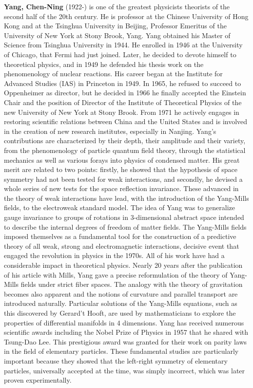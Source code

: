 \textbf{Yang, Chen-Ning} (1922-) is one of the greatest physicists theorists of the second half of the 20th century. He is professor at the Chinese University of Hong Kong and at the Tsinghua University in Beijing, Professor Emeritus of the University of New York at Stony Brook, Yang. Yang obtained his Master of Science from Tsinghua University in 1944. He enrolled in 1946 at the University of Chicago, that Fermi had just joined. Later, he decided to devote himself to theoretical physics, and in 1949 he defended his thesis work on the phenomenology of nuclear reactions. His career began at the Institute for Advanced Studies (IAS) in Princeton in 1949. In 1965, he refused to succeed to Oppenheimer as director, but he decided in 1966 he finally accepted the Einstein Chair and the position of Director of the Institute of Theoretical Physics of the new University of New York at Stony Brook. From 1971 he actively engages in restoring scientific relations between China and the United States and is involved in the creation of new research institutes, especially in Nanjing. Yang's contributions are characterized by their depth, their amplitude and their variety, from the phenomenology of particle quantum field theory, through the statistical mechanics as well as various forays into physics of condensed matter. His great merit are related to two points: firstly, he showed that the hypothesis of space symmetry had not been tested for weak interactions, and secondly, he devised a whole series of new tests for the space reflection invariance. These advanced in the theory of weak interactions have lead, with the introduction of the Yang-Mills fields, to the electroweak standard model. The idea of Yang was to generalize gauge invariance to groups of rotations in 3-dimensional abstract space intended to describe the internal degrees of freedom of matter fields. The Yang-Mills fields imposed themselves as a fundamental tool for the construction of a predictive theory of all weak, strong and electromagnetic interactions, decisive event that engaged the revolution in physics in the 1970s. All of his work have had a considerable impact in theoretical physics. Nearly 20 years after the publication of his article with Mills, Yang gave a precise reformulation of the theory of Yang-Mills fields under strict fiber spaces. The analogy with the theory of gravitation becomes also apparent and the notions of curvature and parallel transport are introduced naturally. Particular solutions of the Yang-Mills equations, such as this discovered by Gerard't Hooft, are used by mathematicians to explore the properties of differential manifolds in 4 dimensions. Yang has received numerous scientific awards including the Nobel Prize of Physics in 1957 that he shared with Tsung-Dao Lee. This prestigious award was granted for their work on parity laws in the field of elementary particles. These fundamental studies are particularly important because they showed that the left-right symmetry of elementary particles, universally accepted at the time, was simply incorrect, which was later proven experimentally.

